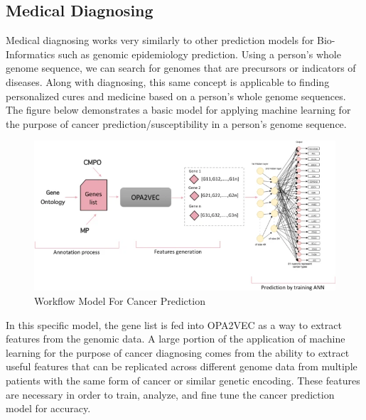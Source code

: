 \documentclass[12pt,journal,compsoc]{IEEEtran}
\begin{document}
\subsection{Medical Diagnosing}
Medical diagnosing works very similarly to other prediction models for Bio-Informatics such as genomic epidemiology prediction. Using a person's whole genome sequence, we can search for genomes that are precursors or indicators of diseases. Along with diagnosing, this same concept is applicable to finding personalized cures and medicine based on a person's whole genome sequences. The figure below demonstrates a basic model for applying machine learning for the purpose of cancer prediction/susceptibility in a person's genome sequence.
\begin{figure}[H]
    \centering
    \includegraphics[width=\linewidth]{images/Screenshot 2022-06-07 at 23-00-03 Ontology-based prediction of cancer driver genes - Scientific Reports.png}
    \caption{Workflow Model For Cancer Prediction}
    \label{fig:Workflow Model For Cancer Prediction}
\end{figure}
In this specific model, the gene list is fed into OPA2VEC as a way to extract features from the genomic data\cite{Althubaiti2019}. A large portion of the application of machine learning for the purpose of cancer diagnosing comes from the ability to extract useful features that can be replicated across different genome data from multiple patients with the same form of cancer or similar genetic encoding. These features are necessary in order to train, analyze, and fine tune the cancer prediction model for accuracy.
\end{document}

